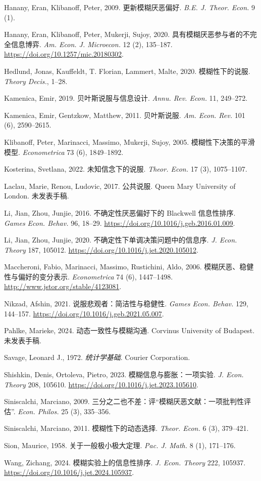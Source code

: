 \documentclass[12pt,a4paper]{article}
\theoremstyle{definition}
\theoremstyle{remark}
\newenvironment{translation}{%
    \par\smallskip\noindent%
    \begin{tcolorbox}[%
        colback=blue!3!white,%
        colframe=blue!40!black,%
        title=\textbf{中文翻译},%
        fonttitle=\small\bfseries,%
        left=0pt, right=0pt, top=2pt, bottom=2pt,%
        boxrule=0.5pt,%
        arc=0pt,%
        outer arc=0pt%
    ]%
    \small\color{blue!60!black}%
}{%
    \end{tcolorbox}\medskip%
}
\begin{document}
\begin{translation}
\noindent Hanany, Eran, Klibanoff, Peter, 2009. 更新模糊厌恶偏好. \textit{B.E. J. Theor. Econ.} 9 (1).

\noindent Hanany, Eran, Klibanoff, Peter, Mukerji, Sujoy, 2020. 具有模糊厌恶参与者的不完全信息博弈. \textit{Am. Econ. J. Microecon.} 12 (2), 135--187. \url{https://doi.org/10.1257/mic.20180302}.

\noindent Hedlund, Jonas, Kauffeldt, T. Florian, Lammert, Malte, 2020. 模糊性下的说服. \textit{Theory Decis.}, 1--28.

\noindent Kamenica, Emir, 2019. 贝叶斯说服与信息设计. \textit{Annu. Rev. Econ.} 11, 249--272.

\noindent Kamenica, Emir, Gentzkow, Matthew, 2011. 贝叶斯说服. \textit{Am. Econ. Rev.} 101 (6), 2590--2615.

\noindent Klibanoff, Peter, Marinacci, Massimo, Mukerji, Sujoy, 2005. 模糊性下决策的平滑模型. \textit{Econometrica} 73 (6), 1849--1892.

\noindent Kosterina, Svetlana, 2022. 未知信念下的说服. \textit{Theor. Econ.} 17 (3), 1075--1107.

\noindent Laclau, Marie, Renou, Ludovic, 2017. 公共说服. Queen Mary University of London. 未发表手稿.

\noindent Li, Jian, Zhou, Junjie, 2016. 不确定性厌恶偏好下的 Blackwell 信息性排序. \textit{Games Econ. Behav.} 96, 18--29. \url{https://doi.org/10.1016/j.geb.2016.01.009}.

\noindent Li, Jian, Zhou, Junjie, 2020. 不确定性下单调决策问题中的信息序. \textit{J. Econ. Theory} 187, 105012. \url{https://doi.org/10.1016/j.jet.2020.105012}.

\noindent Maccheroni, Fabio, Marinacci, Massimo, Rustichini, Aldo, 2006. 模糊厌恶、稳健性与偏好的变分表示. \textit{Econometrica} 74 (6), 1447--1498. \url{http://www.jstor.org/stable/4123081}.

\noindent Nikzad, Afshin, 2021. 说服悲观者：简洁性与稳健性. \textit{Games Econ. Behav.} 129, 144--157. \url{https://doi.org/10.1016/j.geb.2021.05.007}.

\noindent Pahlke, Marieke, 2024. 动态一致性与模糊沟通. Corvinus University of Budapest. 未发表手稿.

\noindent Savage, Leonard J., 1972. \textit{统计学基础}. Courier Corporation.

\noindent Shishkin, Denis, Ortoleva, Pietro, 2023. 模糊信息与膨胀：一项实验. \textit{J. Econ. Theory} 208, 105610. \url{https://doi.org/10.1016/j.jet.2023.105610}.

\noindent Siniscalchi, Marciano, 2009. 三分之二也不差：评``模糊厌恶文献：一项批判性评估''. \textit{Econ. Philos.} 25 (3), 335--356.

\noindent Siniscalchi, Marciano, 2011. 模糊性下的动态选择. \textit{Theor. Econ.} 6 (3), 379--421.

\noindent Sion, Maurice, 1958. 关于一般极小极大定理. \textit{Pac. J. Math.} 8 (1), 171--176.

\noindent Wang, Zichang, 2024. 模糊实验上的信息性排序. \textit{J. Econ. Theory} 222, 105937. \url{https://doi.org/10.1016/j.jet.2024.105937}.
\end{translation}
\end{document}
